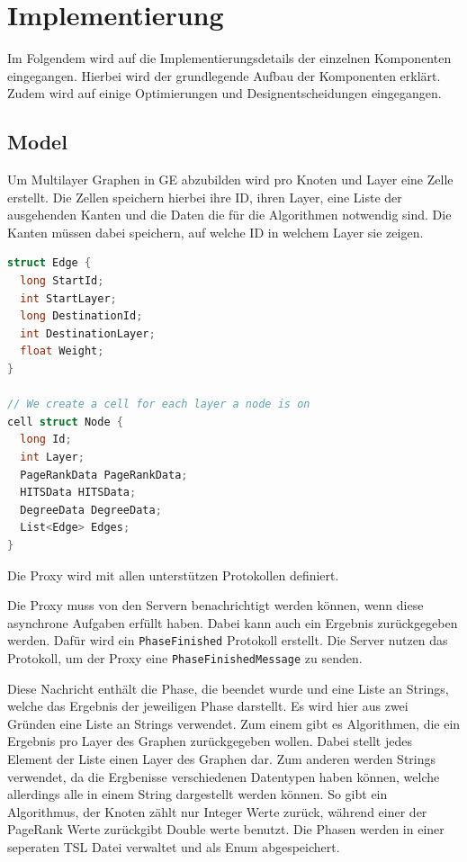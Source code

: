 \section{Implementierung}

Im Folgendem wird auf die Implementierungsdetails der einzelnen Komponenten eingegangen. Hierbei wird der grundlegende Aufbau der Komponenten erklärt.
Zudem wird auf einige Optimierungen und Designentscheidungen eingegangen.


\subsection{Model}

Um Multilayer Graphen in GE abzubilden wird pro Knoten und Layer eine Zelle erstellt. Die Zellen speichern hierbei ihre ID, ihren Layer, eine Liste der ausgehenden Kanten und die Daten die für die Algorithmen notwendig sind.
Die Kanten müssen dabei speichern, auf welche ID in welchem Layer sie zeigen.

\begin{lstlisting}[language=c,label={lst:tslModel}, caption={TSl Definition von Multilayer Knoten und Kanten.}]
struct Edge {
  long StartId;
  int StartLayer;
  long DestinationId;
  int DestinationLayer;
  float Weight;
}

// We create a cell for each layer a node is on
cell struct Node {
  long Id;
  int Layer;
  PageRankData PageRankData;
  HITSData HITSData;
  DegreeData DegreeData;
  List<Edge> Edges;
}
\end{lstlisting}

Die Proxy wird mit allen unterstützen Protokollen definiert. 

Die Proxy muss von den Servern benachrichtigt werden können, wenn diese asynchrone Aufgaben erfüllt haben. Dabei kann auch ein Ergebnis zurückgegeben werden.
Dafür wird ein \verb|PhaseFinished| Protokoll erstellt. Die Server nutzen das Protokoll, um der Proxy eine \verb|PhaseFinishedMessage| zu senden.

Diese Nachricht enthält die Phase, die beendet wurde und eine Liste an Strings, welche das Ergebnis der jeweiligen Phase darstellt. Es wird hier aus zwei Gründen eine Liste an Strings verwendet. Zum einem gibt es Algorithmen, die ein Ergebnis pro Layer des Graphen zurückgegeben wollen.
Dabei stellt jedes Element der Liste einen Layer des Graphen dar. Zum anderen werden Strings verwendet, da die Ergbenisse verschiedenen Datentypen haben können, welche allerdings alle in einem String dargestellt werden können. So gibt ein Algorithmus, der Knoten zählt nur Integer Werte zurück, während einer der PageRank Werte zurückgibt Double werte benutzt.
Die Phasen werden in einer seperaten TSL Datei verwaltet und als Enum abgespeichert.

